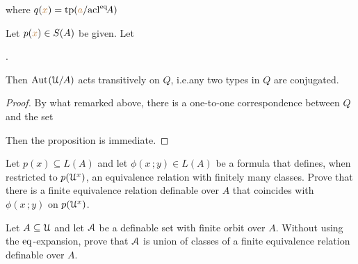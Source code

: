 \hfill where  $q({\color{brown} x})={\rm tp}({\color{brown} a}/{\rm acl}^{{\rm eq}}\!A)$



\begin{proposition}\label{prop_trans_action}
  Let $p({\color{brown} x})\in S(A)$ be given.
  Let \smallskip
  
  .\smallskip
  
  Then ${\rm Aut\kern.15ex}(\EuScript U/A)$ acts transitively on $Q$, i.e.\@ any two types in $Q$ are conjugated.
\end{proposition}

\begin{proof}
  By what remarked above, there is a one-to-one correspondence between $Q$ and the set


  Then the proposition is immediate.
\end{proof}

\begin{exercise}
Let $p(x)\subseteq L(A)$ and let $\phi(x\,;y)\in L(A)$ be a formula that defines, when restricted to $p(\EuScript U^x)$, an equivalence relation with finitely many classes.
Prove that there is a finite equivalence relation definable over $A$ that coincides with $\phi(x\,;y)$ on $p(\EuScript U^x)$.
\end{exercise}

\begin{exercise}\label{ex_feqthm_senza_eq}
Let $A\subseteq\EuScript U$ and let $\EuScript A$ be a definable set with finite orbit over $A$.
Without using the ${{\rm eq}}$-expansion, prove that $\EuScript A$ is union of classes of a finite equivalence relation definable over $A$.
\end{exercise}

